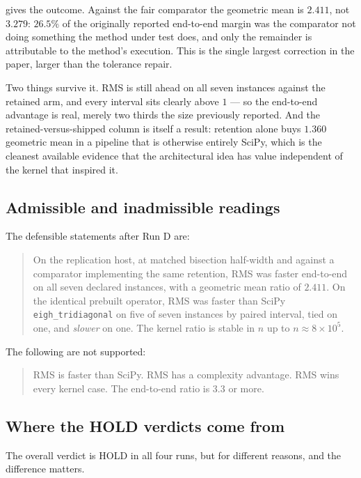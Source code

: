 \documentclass[twocolumn,10pt,a4paper]{article}
\theoremstyle{plain}
\theoremstyle{definition}
\newcommand{\HOLD}{\textsf{HOLD}}
\begin{document}
 gives the outcome. Against the fair comparator the geometric mean
is $2.411$, not $3.279$: $26.5\%$ of the originally reported end-to-end margin
was the comparator not doing something the method under test does, and only the
remainder is attributable to the method's execution. This is the single largest
correction in the paper, larger than the tolerance repair.

Two things survive it. RMS is still ahead on all seven instances against the
retained arm, and every interval sits clearly above $1$ --- so the end-to-end
advantage is real, merely two thirds the size previously reported. And the
retained-versus-shipped column is itself a result: retention alone buys $1.360$
geometric mean in a pipeline that is otherwise entirely SciPy, which is the
cleanest available evidence that the architectural idea has value independent of
the kernel that inspired it.

\subsection{Admissible and inadmissible readings}

The defensible statements after Run D are:
\begin{quote}
On the replication host, at matched bisection half-width and against a
comparator implementing the same retention, RMS was faster end-to-end on all
seven declared instances, with a geometric mean ratio of $2.411$. On the
identical prebuilt operator, RMS was faster than SciPy
\texttt{eigh\_tridiagonal} on five of seven instances by paired interval, tied
on one, and \emph{slower} on one. The kernel ratio is stable in $n$ up to
$n \approx 8\times10^{5}$.
\end{quote}
The following are not supported:
\begin{quote}
RMS is faster than SciPy. \quad RMS has a complexity advantage. \quad
RMS wins every kernel case. \quad The end-to-end ratio is $3.3$ or more.
\end{quote}

\subsection{Where the \HOLD{} verdicts come from}
\label{sec:fairness}

The overall verdict is \HOLD{} in all four runs, but for different reasons, and
the difference matters.
\end{document}
